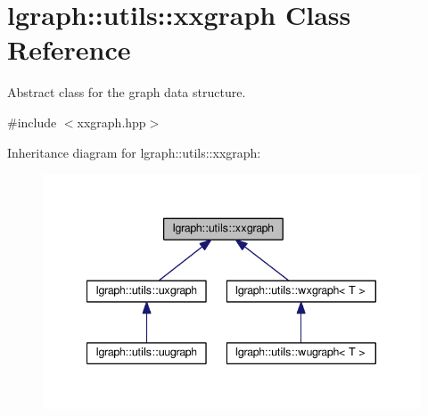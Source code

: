 \hypertarget{classlgraph_1_1utils_1_1xxgraph}{}\section{lgraph\+:\+:utils\+:\+:xxgraph Class Reference}
\label{classlgraph_1_1utils_1_1xxgraph}


Abstract class for the graph data structure.  




{\ttfamily \#include $<$xxgraph.\+hpp$>$}



Inheritance diagram for lgraph\+:\+:utils\+:\+:xxgraph\+:\nopagebreak
\begin{figure}[H]
\begin{center}
\leavevmode
\includegraphics[width=340pt]{classlgraph_1_1utils_1_1xxgraph__inherit__graph}
\end{center}
\end{figure}
